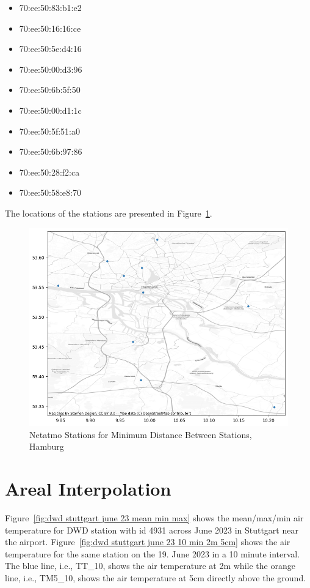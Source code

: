 \begin{itemize}
    \item 70:ee:50:83:b1:e2 
    \item 70:ee:50:16:16:ce
    \item 70:ee:50:5e:d4:16
    \item 70:ee:50:00:d3:96
    \item 70:ee:50:6b:5f:50
    \item 70:ee:50:00:d1:1c
    \item 70:ee:50:5f:51:a0
    \item 70:ee:50:6b:97:86
    \item 70:ee:50:28:f2:ca
    \item 70:ee:50:58:e8:70
\end{itemize}

The locations of the stations are presented in Figure~\ref{fig:eval_hamburg_locations_point_histb_10_map}.

\begin{figure}[ht]
    \centering
    \includegraphics[width=1\textwidth]{images/eval_hamburg_locations_point_histb_10_map.png}
    \caption{Netatmo Stations for Minimum Distance Between Stations, Hamburg}
    \label{fig:eval_hamburg_locations_point_histb_10_map}
\end{figure}

\section{Areal Interpolation}

Figure~\ref{fig:dwd stuttgart june 23 mean min max} shows the mean/max/min air temperature for DWD station with id 4931 across June 2023 in Stuttgart near the airport.
Figure~\ref{fig:dwd stuttgart june 23 10 min 2m 5cm} shows the air temperature for the same station on the 19. June 2023 in a 10 minute interval. The blue line, i.e., TT\_10, shows the air temperature at 2m while the orange line, i.e., TM5\_10, shows the air temperature at 5cm directly above the ground.

